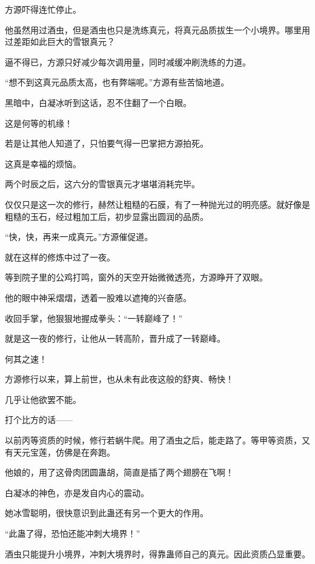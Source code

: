 
\begin{this_body}



方源吓得连忙停止。

他虽然用过酒虫，但是酒虫也只是洗练真元，将真元品质拔生一个小境界。哪里用过差距如此巨大的雪银真元？

逼不得已，方源只好减少每次调用量，同时减缓冲刷洗练的力道。

“想不到这真元品质太高，也有弊端呢。”方源有些苦恼地道。

黑暗中，白凝冰听到这话，忍不住翻了一个白眼。

这是何等的机缘！

若是让其他人知道了，只怕要气得一巴掌把方源拍死。

这真是幸福的烦恼。

两个时辰之后，这六分的雪银真元才堪堪消耗完毕。

仅仅只是这一次的修行，赫然让粗糙的石膜，有了一种抛光过的明亮感。就好像是粗糙的玉石，经过粗加工后，初步显露出圆润的品质。

“快，快，再来一成真元。”方源催促道。

就在这样的修炼中过了一夜。

等到院子里的公鸡打鸣，窗外的天空开始微微透亮，方源睁开了双眼。

他的眼中神采熠熠，透着一股难以遮掩的兴奋感。

收回手掌，他狠狠地握成拳头：“一转巅峰了！”

就是这一夜的修行，让他从一转高阶，晋升成了一转巅峰。

何其之速！

方源修行以来，算上前世，也从未有此夜这般的舒爽、畅快！

几乎让他欲罢不能。

打个比方的话——

以前丙等资质的时候，修行若蜗牛爬。用了酒虫之后，能走路了。等甲等资质，又有天元宝莲，仿佛是在奔跑。

他娘的，用了这骨肉团圆蛊胡，简直是插了两个翅膀在飞啊！

白凝冰的神色，亦是发自内心的震动。

她冰雪聪明，很快意识到此蛊还有另一个更大的作用。

“此蛊了得，恐怕还能冲刺大境界！”

酒虫只能提升小境界，冲刺大境界时，得靠蛊师自己的真元。因此资质凸显重要。


\end{this_body}
